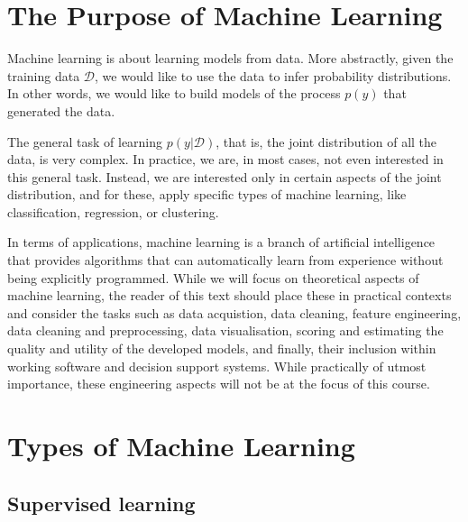 \begin{refsection}
\section{The Purpose of Machine Learning}


Machine learning is about learning models from data. More abstractly, given the training data $\mathcal{D}$, we would like to use the data to infer probability distributions. In other words, we would like to build models of the process $p(y)$ that generated the data.

The general task of learning $p(y|\mathcal{D})$, that is, the joint distribution of all the data, is very complex. In practice, we are, in most cases, not even interested in this general task. Instead, we are interested only in certain aspects of the joint distribution, and for these, apply specific types of machine learning, like classification, regression, or clustering.

In terms of applications, machine learning is a branch of artificial intelligence that provides algorithms that can automatically learn from experience without being explicitly programmed. While we will focus on theoretical aspects of machine learning, the reader of this text should place these in practical contexts and consider the tasks such as data acquistion, data cleaning, feature engineering, data cleaning and preprocessing, data visualisation, scoring and estimating the quality and utility of the developed models, and finally, their inclusion within working software and decision support systems. While practically of utmost importance, these engineering aspects will not be at the focus of this course.

\section{Types of Machine Learning}

\subsection*{Supervised learning}


\end{refsection}
